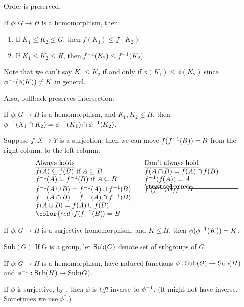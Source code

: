 Order is preserved:
\begin{lemma}
If $\phi:G\to H$ is a homomorphism, then:
\begin{enumerate}[label=(\alph*)]
\item If $K_1\le K_2\le G$, then $f(K_1)\le f(K_2)$
\item If $K_1\le K_2\le H$, then $f^{-1}(K_1)\le f^{-1}(K_2)$
\end{enumerate}
\end{lemma}
Note that we can't say $K_1\le K_2$ if and only if $\phi(K_1)\le \phi(K_2)$ since $\phi^{-1}(\phi(K))\ne K$ in general.

Also, pullback preserves intersection:
\begin{lemma}
If $\phi:G\to H$ is a homomorphism, and $K_1,K_2\le H$, then $\phi^{-1}(K_1\cap K_2)=\phi^{-1}(K_1)\cap \phi^{-1}(K_2)$.
\end{lemma}

Suppose $f:X\to Y$ is a surjection, then we can move $f(f^{-1}(B))=B$ from the right column to the left column:
$$
\begin{array}{lll}
	\text{\underline{Always holds}} && \text{\underline{Don't always hold}}\\
	f(A) \subseteq f(B) \text { if } A \subseteq B && f(A \cap B)=f(A) \cap f(B) \\
	f^{-1}(A) \subseteq f^{-1}(B) \text { if } A \subseteq B && f^{-1}(f(A))=A \\
	f^{-1}(A \cup B)=f^{-1}(A) \cup f^{-1}(B) && \hcancel[red]{f\left(f^{-1}(B)\right)=B} \\
	f^{-1}(A \cap B)=f^{-1}(A) \cap f^{-1}(B) && \\
	f(A \cup B)=f(A) \cup f(B) &&\\
	{\color{red} f(f\inv(B))=B}
	\end{array}
$$

\begin{lemma}
If $\phi:G\to H$ is a surjective homomorphism, and $K\le H$, then $\phi(\phi^{-1}(K))=K$.
\end{lemma}

\begin{notation}{Sub$(G)$}
If G is a group, let \textbf{$\operatorname{Sub}(G)$} denote set of subgroups of $G$.
\end{notation}

If $\phi:G\to H$ is a homomorphism, have induced functions $\phi:\operatorname{Sub}(G)\to \operatorname{Sub}(H)$ and $\phi^{-1}:\operatorname{Sub}(H)\to \operatorname{Sub}(G)$. 

If $\phi$ is surjective, by , then $\phi$ is \textit{left} inverse to $\phi^{-1}$. (It might not have inverse. Sometimes we use $\phi^*$.)

